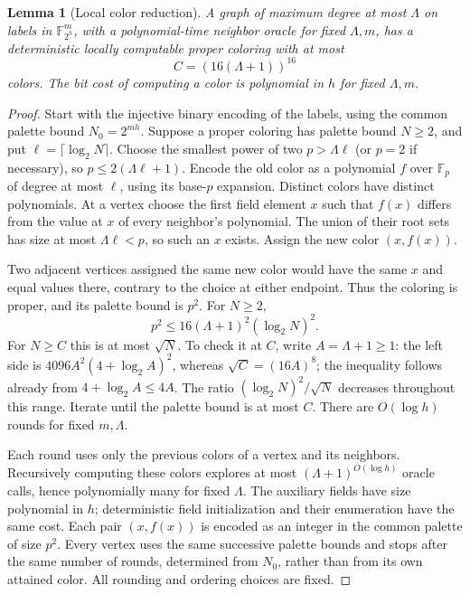 \documentclass[11pt,a4paper]{article}
\newcommand{\F}{\mathbb F}
\newtheorem{lemma}[theorem]{Lemma}
\theoremstyle{definition}
\theoremstyle{remark}
\numberwithin{equation}{section}
\begin{document}
\begin{lemma}[Local color reduction]\label{lem:color}
A graph of maximum degree at most $\Lambda$ on labels in $\F_{2^h}^m$, with a polynomial-time neighbor oracle for fixed $\Lambda,m$, has a deterministic locally computable proper coloring with at most
\begin{equation}\label{eq:palette}
C=(16(\Lambda+1))^{16}
\end{equation}
colors. The bit cost of computing a color is polynomial in $h$ for fixed $\Lambda,m$.
\end{lemma}

\begin{proof}
Start with the injective binary encoding of the labels, using the common palette bound $N_0=2^{mh}$. Suppose a proper coloring has palette bound $N\ge2$, and put $\ell=\lceil\log_2N\rceil$. Choose the smallest power of two $p>\Lambda\ell$ (or $p=2$ if necessary), so $p\le2(\Lambda\ell+1)$. Encode the old color as a polynomial $f$ over $\F_p$ of degree at most $\ell$, using its base-$p$ expansion. Distinct colors have distinct polynomials. At a vertex choose the first field element $x$ such that $f(x)$ differs from the value at $x$ of every neighbor's polynomial. The union of their root sets has size at most $\Lambda\ell<p$, so such an $x$ exists. Assign the new color $(x,f(x))$.

Two adjacent vertices assigned the same new color would have the same $x$ and equal values there, contrary to the choice at either endpoint. Thus the coloring is proper, and its palette bound is $p^2$. For $N\ge2$,
\[
p^2\le16(\Lambda+1)^2(\log_2N)^2.
\]
For $N\ge C$ this is at most $\sqrt N$. To check it at $C$, write $A=\Lambda+1\ge1$: the left side is $4096A^2(4+\log_2A)^2$, whereas $\sqrt C=(16A)^8$; the inequality follows already from $4+\log_2A\le4A$. The ratio $(\log_2N)^2/\sqrt N$ decreases throughout this range. Iterate until the palette bound is at most $C$. There are $O(\log h)$ rounds for fixed $m,\Lambda$.

Each round uses only the previous colors of a vertex and its neighbors. Recursively computing these colors explores at most $(\Lambda+1)^{O(\log h)}$ oracle calls, hence polynomially many for fixed $\Lambda$. The auxiliary fields have size polynomial in $h$; deterministic field initialization and their enumeration have the same cost. Each pair $(x,f(x))$ is encoded as an integer in the common palette of size $p^2$. Every vertex uses the same successive palette bounds and stops after the same number of rounds, determined from $N_0$, rather than from its own attained color. All rounding and ordering choices are fixed.
\end{proof}
\end{document}
